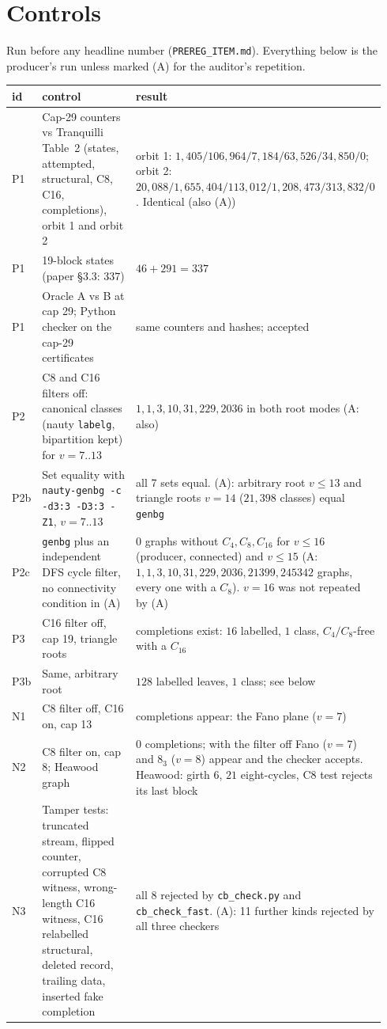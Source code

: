 \documentclass[10pt]{article}
\begin{document}
\section{Controls}\label{sec:controls}
Run before any headline number (\texttt{PREREG\_ITEM.md}). Everything below is the producer's run unless marked (A) for the auditor's repetition.
\begin{center}\small
\begin{tabular}{@{}p{0.07\linewidth}p{0.60\linewidth}p{0.27\linewidth}@{}}
\toprule id & control & result\\ \midrule
P1 & Cap-29 counters vs Tranquilli Table~2 (states, attempted, structural, C8, C16, completions), orbit 1 and orbit 2 & orbit 1: $1{,}405/106{,}964/7{,}184/63{,}526/34{,}850/0$; orbit 2: $20{,}088/1{,}655{,}404/113{,}012/1{,}208{,}473/313{,}832/0$. Identical (also (A)) \\
P1 & 19-block states (paper \S3.3: $337$) & $46+291=337$ \\
P1 & Oracle A vs B at cap 29; Python checker on the cap-29 certificates & same counters and hashes; accepted \\
P2 & C8 and C16 filters off: canonical classes (nauty \texttt{labelg}, bipartition kept) for $v=7..13$ & $1,1,3,10,31,229,2036$ in both root modes (A: also) \\
P2b & Set equality with \texttt{nauty-genbg -c -d3:3 -D3:3 -Z1}, $v=7..13$ & all 7 sets equal. (A): arbitrary root $v\le13$ and triangle roots $v=14$ ($21{,}398$ classes) equal \texttt{genbg} \\
P2c & \texttt{genbg} plus an independent DFS cycle filter, no connectivity condition in (A) & $0$ graphs without $C_4,C_8,C_{16}$ for $v\le16$ (producer, connected) and $v\le15$ (A: $1,1,3,10,31,229,2036,21399,245342$ graphs, every one with a $C_8$). $v=16$ was not repeated by (A) \\
P3 & C16 filter off, cap 19, triangle roots & completions exist: $16$ labelled, $1$ class, $C_4/C_8$-free with a $C_{16}$ \\
P3b & Same, arbitrary root & $128$ labelled leaves, $1$ class; see below \\
N1 & C8 filter off, C16 on, cap 13 & completions appear: the Fano plane ($v=7$) \\
N2 & C8 filter on, cap 8; Heawood graph & $0$ completions; with the filter off Fano ($v=7$) and $8_3$ ($v=8$) appear and the checker accepts. Heawood: girth $6$, $21$ eight-cycles, C8 test rejects its last block \\
N3 & Tamper tests: truncated stream, flipped counter, corrupted C8 witness, wrong-length C16 witness, C16 relabelled structural, deleted record, trailing data, inserted fake completion & all 8 rejected by \texttt{cb\_check.py} and \texttt{cb\_check\_fast}. (A): 11 further kinds rejected by all three checkers \\
\bottomrule
\end{tabular}
\end{center}
\end{document}
